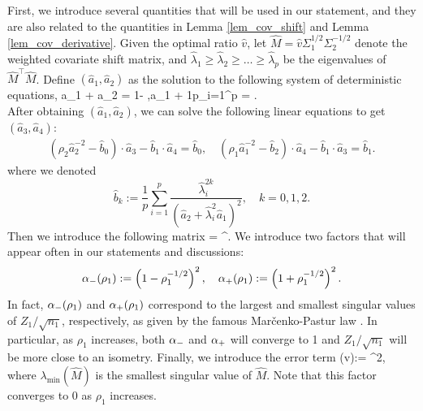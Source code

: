 First, we  introduce several quantities that will be used in our statement, and they are also related to the quantities in Lemma \ref{lem_cov_shift} and Lemma \ref{lem_cov_derivative}. Given the optimal ratio $\hat v$, let $\hat{M} = \hat{v} \Sigma_1^{1/2}\Sigma_2^{-1/2}$ denote the weighted covariate shift matrix, and ${\hat\lambda}_1\ge {\hat\lambda}_2 \ge \dots \ge {\hat\lambda}_p$ be the eigenvalues of $\hat{M}^{\top}\hat{M}$. Define $(\hat a_1, \hat a_2)$ as the solution to the following system of deterministic equations,
	\be
		 \hat a_1 +  \hat a_2 = 1- ,\quad  \hat a_1 + \cdot \frac1p\sum_{i=1}^p  = .\label{eq_a2} \\
		 \ee
		 After obtaining $(\hat a_1,\hat a_2)$, we can solve the following linear equations to get $(\hat a_3,\hat a_4)$:
\begin{gather}
		\left(\rho_2 \hat a_2^{-2}- \hat b_0\right)\cdot \hat  a_3 - \hat b_1 \cdot \hat a_4
		=\hat b_0, \quad \left(\rho_1\hat a_1^{-2} - \hat b_2  \right)\cdot \hat a_4 - \hat b_1 \cdot \hat a_3 =\hat b_1 .\label{eq_a3} 
	\end{gather}
where we denoted
$$\hat b_k:= \frac1{p}\sum_{i=1}^p \frac{\hat \lambda_i^{2k}}{ (\hat a_2 +\hat  \lambda_i^2\hat a_1)^2  },\quad k=0,1,2.$$
Then we introduce the following matrix
\be\label{defnpihat}\Pi =   ^{\top}.\ee
We introduce two factors that will appear often in our statements and discussions:
$$\alpha_-(\rho_1):=\left(1- \rho_1^{-1/2}\right)^2,\quad \alpha_+(\rho_1):=\left(1 + \rho_1^{-1/2}\right)^2.$$ 
In fact, $\alpha_-(\rho_1)$ and $\alpha_+(\rho_1)$ correspond to the largest and smallest singular values of $Z_1/\sqrt{n_1}$, respectively, as given by the famous Mar{\v c}enko-Pastur law \cite{MP}. In particular, as $\rho_1$ increases, both $\alpha_-$ and $\alpha_+$ will converge to 1 and $Z_1/\sqrt{n_1}$ will be more close to an isometry. Finally, we introduce the error term  
\be\label{eq_deltaextra}\delta\equiv \delta(\hat v):= \cdot  {}^2,\ee
where $\lambda_{\min}(\hat M)$ is the smallest singular value of $\hat M$. Note that this factor converges to 0 as $\rho_1$ increases.

